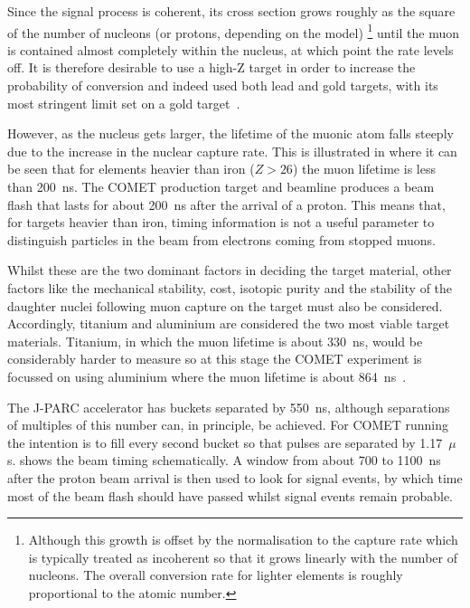 Since the signal process is coherent, its cross section grows roughly as the square of the number of nucleons (or protons, depending on the model)%
\footnote{Although this growth is offset by the normalisation to the capture rate which is typically treated as incoherent so that it grows linearly with the number of nucleons.
The overall conversion rate for lighter elements is roughly proportional to the atomic number.}
until the muon is contained almost completely within the nucleus, at which point the rate levels off.
It is therefore desirable to use a high-Z target in order to increase the probability of conversion and indeed \sindrumII used both lead and gold targets, with its most stringent limit set on a gold target~\cite{sindrum2006}.

However, as the nucleus gets larger, the lifetime of the muonic atom falls steeply due to the increase in the nuclear capture rate.
This is illustrated in  where it can be seen that for elements heavier than iron ($Z>26$) the muon lifetime is less than 200~ns.
The COMET production target and beamline produces a beam flash that lasts for about 200~ns after the arrival of a proton.
This means that, for targets heavier than iron, timing information is not a useful parameter to distinguish particles in the beam from electrons coming from stopped muons.

Whilst these are the two dominant factors in deciding the target material, other factors like the mechanical stability, cost, isotopic purity and the stability of the daughter nuclei following muon capture on the target must also be considered.
Accordingly, titanium and aluminium are considered the two most viable target materials.  
Titanium, in which the muon lifetime is about 330~ns, would be considerably harder to measure \mueconv so at this stage the COMET experiment is focussed on using aluminium where the muon lifetime is about 864~ns~\cite{Suzuki1987}.

\FigTimingSchematic

The J-PARC accelerator has buckets separated by 550~ns, although separations of multiples of this number can, in principle, be achieved.
For COMET running the intention is to fill every second bucket so that pulses are separated by 1.17~$\mu$s.
 shows the beam timing schematically.  
A window from about 700 to 1100~ns after the proton beam arrival is then used to look for signal events, by which time most of the beam flash should have passed whilst signal events remain probable.


